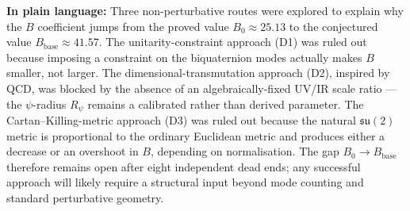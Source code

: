 \documentclass[11pt,a4paper]{article}
\theoremstyle{definition}
\theoremstyle{remark}
\begin{document}
\textbf{In plain language:}
Three non-perturbative routes were explored to explain why the $B$ coefficient
jumps from the proved value $B_0 \approx 25.13$ to the conjectured value
$B_{\mathrm{base}} \approx 41.57$.
The unitarity-constraint approach (D1) was ruled out because imposing a constraint
on the biquaternion modes actually makes $B$ smaller, not larger.
The dimensional-transmutation approach (D2), inspired by QCD, was blocked by the
absence of an algebraically-fixed UV/IR scale ratio — the $\psi$-radius $R_\psi$
remains a calibrated rather than derived parameter.
The Cartan--Killing-metric approach (D3) was ruled out because the natural
$\mathfrak{su}(2)$ metric is proportional to the ordinary Euclidean metric and
produces either a decrease or an overshoot in $B$, depending on normalisation.
The gap $B_0 \to B_{\mathrm{base}}$ therefore remains open after eight independent
dead ends; any successful approach will likely require a structural input beyond
mode counting and standard perturbative geometry.

\ifdefined\INCLUDEMODE\else
\end{document}
